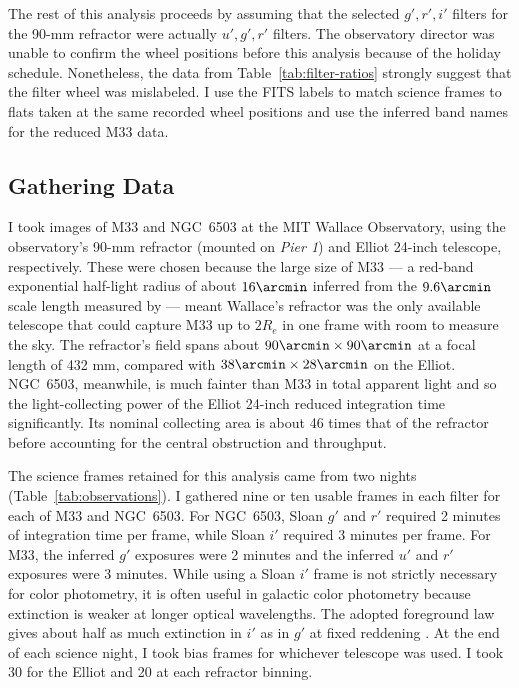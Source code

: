 The rest of this analysis proceeds by assuming that the selected $g',r',i'$ filters for the 90-mm refractor were actually $u',g',r'$ filters. The observatory director was unable to confirm the wheel positions before this analysis because of the holiday schedule. Nonetheless, the data from Table~\ref{tab:filter-ratios} strongly suggest that the filter wheel was mislabeled. I use the FITS labels to match science frames to flats taken at the same recorded wheel positions and use the inferred band names for the reduced M33 data.

\subsection{Gathering Data}
\label{sec:observations}

I took images of M33 and NGC~6503 at the MIT Wallace Observatory, using the observatory's 90-mm refractor (mounted on \textit{Pier 1}) and Elliot 24-inch telescope, respectively. These were chosen because the large size of M33 --- a red-band exponential half-light radius of about $16\arcmin$ inferred from the $9.6\arcmin$ scale length measured by \citet{methKent} --- meant Wallace's refractor was the only available telescope that could capture M33 up to $2R_e$ in one frame with room to measure the sky. The refractor's field spans about $90\arcmin\times90\arcmin$ at a focal length of 432 mm, compared with $38\arcmin\times28\arcmin$ on the Elliot. NGC~6503, meanwhile, is much fainter than M33 in total apparent light and so the light-collecting power of the Elliot 24-inch reduced integration time significantly. Its nominal collecting area is about 46 times that of the refractor before accounting for the central obstruction and throughput. \citep{methWallace}

The science frames retained for this analysis came from two nights (Table~\ref{tab:observations}). I gathered nine or ten usable frames in each filter for each of M33 and NGC~6503. For NGC~6503, Sloan $g'$ and $r'$ required 2 minutes of integration time per frame, while Sloan $i'$ required 3 minutes per frame. For M33, the inferred $g'$ exposures were 2 minutes and the inferred $u'$ and $r'$ exposures were 3 minutes. While using a Sloan $i'$ frame is not strictly necessary for color photometry, it is often useful in galactic color photometry because extinction is weaker at longer optical wavelengths. The adopted foreground law gives about half as much extinction in $i'$ as in $g'$ at fixed reddening \citep{methSF}. At the end of each science night, I took bias frames for whichever telescope was used. I took 30 for the Elliot and 20 at each refractor binning.

